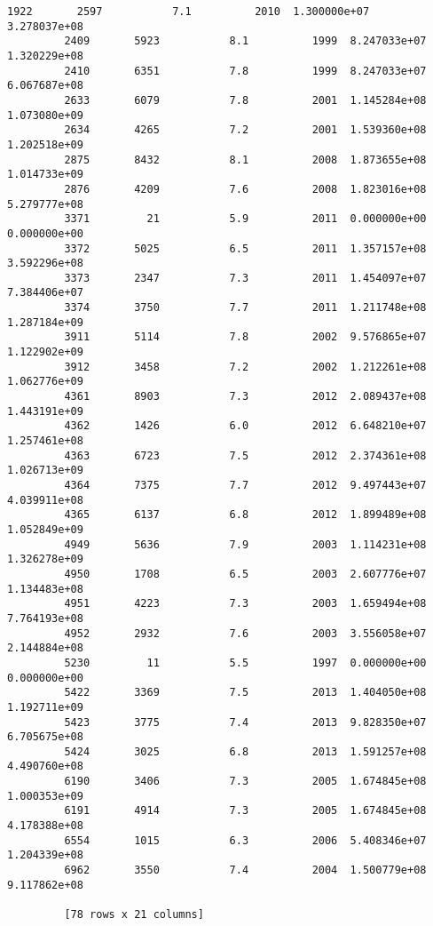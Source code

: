 \documentclass[11pt]{article}
\begin{document}
\begin{Verbatim}[commandchars=\\\{\}]
         1922       2597           7.1          2010  1.300000e+07  3.278037e+08  
         2409       5923           8.1          1999  8.247033e+07  1.320229e+08  
         2410       6351           7.8          1999  8.247033e+07  6.067687e+08  
         2633       6079           7.8          2001  1.145284e+08  1.073080e+09  
         2634       4265           7.2          2001  1.539360e+08  1.202518e+09  
         2875       8432           8.1          2008  1.873655e+08  1.014733e+09  
         2876       4209           7.6          2008  1.823016e+08  5.279777e+08  
         3371         21           5.9          2011  0.000000e+00  0.000000e+00  
         3372       5025           6.5          2011  1.357157e+08  3.592296e+08  
         3373       2347           7.3          2011  1.454097e+07  7.384406e+07  
         3374       3750           7.7          2011  1.211748e+08  1.287184e+09  
         3911       5114           7.8          2002  9.576865e+07  1.122902e+09  
         3912       3458           7.2          2002  1.212261e+08  1.062776e+09  
         4361       8903           7.3          2012  2.089437e+08  1.443191e+09  
         4362       1426           6.0          2012  6.648210e+07  1.257461e+08  
         4363       6723           7.5          2012  2.374361e+08  1.026713e+09  
         4364       7375           7.7          2012  9.497443e+07  4.039911e+08  
         4365       6137           6.8          2012  1.899489e+08  1.052849e+09  
         4949       5636           7.9          2003  1.114231e+08  1.326278e+09  
         4950       1708           6.5          2003  2.607776e+07  1.134483e+08  
         4951       4223           7.3          2003  1.659494e+08  7.764193e+08  
         4952       2932           7.6          2003  3.556058e+07  2.144884e+08  
         5230         11           5.5          1997  0.000000e+00  0.000000e+00  
         5422       3369           7.5          2013  1.404050e+08  1.192711e+09  
         5423       3775           7.4          2013  9.828350e+07  6.705675e+08  
         5424       3025           6.8          2013  1.591257e+08  4.490760e+08  
         6190       3406           7.3          2005  1.674845e+08  1.000353e+09  
         6191       4914           7.3          2005  1.674845e+08  4.178388e+08  
         6554       1015           6.3          2006  5.408346e+07  1.204339e+08  
         6962       3550           7.4          2004  1.500779e+08  9.117862e+08  
         
         [78 rows x 21 columns]
\end{Verbatim}
            
\end{document}
